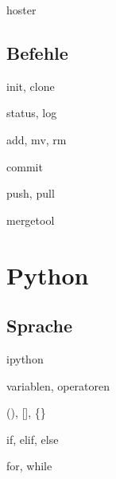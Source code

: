 \documentclass[t]{beamer}
\begin{document}
      \begin{frame}{hoster}
      \end{frame}

    \subsection{Befehle}
      \begin{frame}{init, clone}
      \end{frame}

      \begin{frame}{status, log}
      \end{frame}

      \begin{frame}{add, mv, rm}
      \end{frame}
      
      \begin{frame}{commit}
      \end{frame}
      
      \begin{frame}{push, pull}
      \end{frame}
      
      \begin{frame}{mergetool}
      \end{frame}
  \section{Python}
    \begin{frame}
    \end{frame}
    \subsection{Sprache}
      \begin{frame}{ipython}
      \end{frame}
      
      \begin{frame}{variablen, operatoren}
      \end{frame}
      
      \begin{frame}{(), [], \{\}}
      \end{frame}
      
      \begin{frame}{if, elif, else}
      \end{frame}
      
      \begin{frame}{for, while}
      \end{frame}
      
\end{document}
